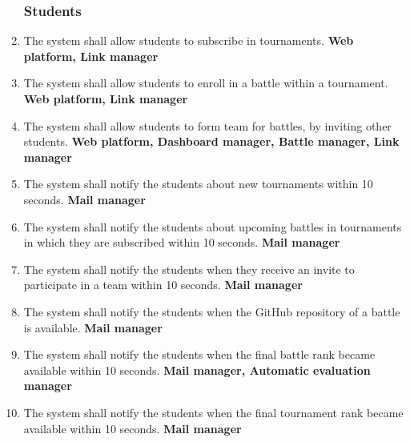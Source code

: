 \begin{enumerate}[label=\textbf{R.\arabic*}]
    \subsubsection*{Students}
    \item {} {The system shall allow students to subscribe in tournaments.} \newline
    \textbf{Web platform, Link manager}
    \item {} {The system shall allow students to enroll in a battle within a tournament.} \newline
    \textbf{Web platform, Link manager}
    \item {} {The system shall allow students to form team for battles, by inviting other students.} \newline
    \textbf{Web platform, Dashboard manager, Battle manager, Link manager}
    \item {} {The system shall notify the students about new tournaments within 10 seconds.} \newline
    \textbf{Mail manager}
    \item {} {The system shall notify the students about upcoming battles in tournaments in which they are subscribed within 10 seconds.} \newline
    \textbf{Mail manager}
     \item {} {The system shall notify the students when they receive an invite to participate in a team within 10 seconds.} \newline
     \textbf{Mail manager}
     \item {} {The system shall notify the students when the GitHub repository of a battle is available.} \newline
     \textbf{Mail manager}
     \item {} {The system shall notify the students when the final battle rank became available within 10 seconds.} \newline
     \textbf{Mail manager, Automatic evaluation manager}
     \item {} {The system shall notify the students when the final tournament rank became available within 10 seconds.} \newline
     \textbf{Mail manager}
\end{enumerate}
